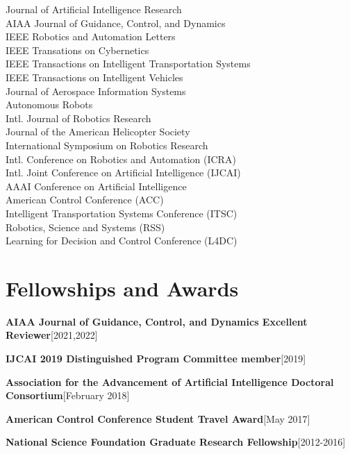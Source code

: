 \documentclass[10pt,roman]{moderncv}
\newcommand{\mycvitem}[2]{
    \textbf{#2}\hfill [#1]\break
}
\begin{document}
\vspace{-2ex}
\begin{multicols}{2}
\small
Journal of Artificial Intelligence Research\\
AIAA Journal of Guidance, Control, and Dynamics\\
IEEE Robotics and Automation Letters\\
IEEE Transations on Cybernetics\\
IEEE Transactions on Intelligent Transportation Systems\\
IEEE Transactions on Intelligent Vehicles\\
Journal of Aerospace Information Systems\\
Autonomous Robots\\
Intl. Journal of Robotics Research\\
Journal of the American Helicopter Society\\
International Symposium on Robotics Research\\
Intl. Conference on Robotics and Automation (ICRA)\\
Intl. Joint Conference on Artificial Intelligence (IJCAI)\\
AAAI Conference on Artificial Intelligence\\
American Control Conference (ACC)\\
Intelligent Transportation Systems Conference (ITSC)\\
Robotics, Science and Systems (RSS)\\
Learning for Decision and Control Conference (L4DC)\\
\end{multicols}


\section{Fellowships and Awards}

\mycvitem{2021,2022}{AIAA Journal of Guidance, Control, and Dynamics Excellent Reviewer}
\mycvitem{2019}{IJCAI 2019 Distinguished Program Committee member}
\mycvitem{February 2018}{Association for the Advancement of Artificial Intelligence Doctoral Consortium}
\mycvitem{May 2017}{American Control Conference Student Travel Award}
\mycvitem{2012-2016}{National Science Foundation Graduate Research Fellowship}
\end{document}
